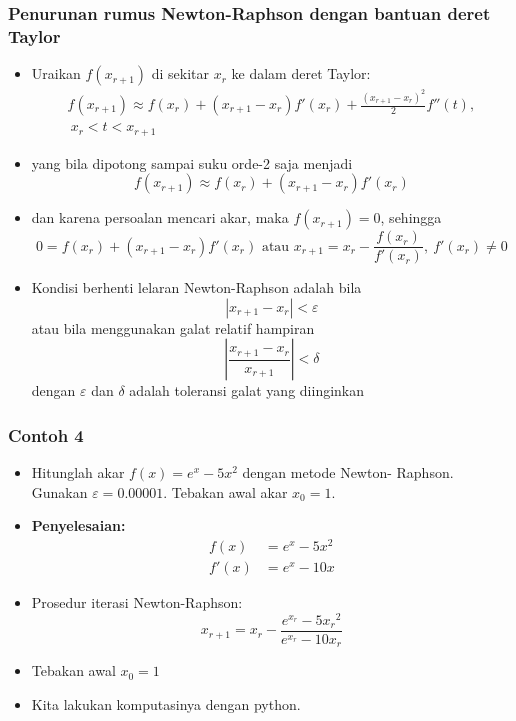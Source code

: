 \documentclass[pdflatex,compress]{beamer}
\begin{document}
\begin{frame}
	\frametitle{Penurunan rumus Newton-Raphson dengan bantuan deret Taylor}
	\begin{itemize}
		\item Uraikan $ f(x_{r+1}) $ di sekitar $ x_r $ ke dalam deret Taylor:
		\begin{align*}
			f(x_{r+1}) \approx f(x_r) + (x_{r+1} - x_r)f'(x_r) + \frac{(x_{r+1} - x_r)^2}{2}f''(t),\\
			~x_r<t<x_{r+1}
		\end{align*}
		\item yang bila dipotong sampai suku orde-2 saja menjadi
		\[ f(x_{r+1}) \approx f(x_r) + (x_{r+1} - x_r)f'(x_r) \]
		\item dan karena persoalan mencari akar, maka $ f(x_{r+1} ) = 0 $, sehingga \[ 0 = f(x_r) + (x_{r+1} - x_r)f'(x_r) \text{ atau } x_{r+1} = x_r - \frac{f(x_r)}{f'(x_r)},~f'(x_r) \neq 0\]
	\end{itemize}
\end{frame}

\begin{frame}
	\begin{itemize}
		\item Kondisi berhenti lelaran Newton-Raphson adalah bila
		\[ | x_{r+1} - x_r | < \varepsilon \]
		atau bila menggunakan galat relatif hampiran
		\[ | \frac{x_{r+1} - x_r}{x_{r+1}} | < \delta \]
		dengan $\varepsilon$ dan $\delta$ adalah toleransi galat yang diinginkan
	\end{itemize}
\end{frame}

\begin{frame}
	\frametitle{Contoh 4}
	\begin{itemize}
		\item Hitunglah akar $ f(x) = e^x - 5x^2 $ dengan metode Newton-
		Raphson. Gunakan $\varepsilon = 0.00001$. Tebakan awal akar $ x_0 = 1 $.
		\item[] \textbf{Penyelesaian:}
		\begin{align*}
			f(x) &= e^x - 5x^2\\
			f'(x) &= e^x - 10x
		\end{align*}
		\item[] Prosedur iterasi Newton-Raphson:
		\[ x_{r+1} = x_r - \frac{e^{x_r} - 5{x_r}^2}{e^{x_r} - 10{x_r}} \]
		\item[] Tebakan awal $ x_0 = 1 $
		\item[] Kita lakukan komputasinya dengan python.
	\end{itemize}
\end{frame}
\end{document}
